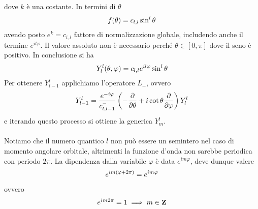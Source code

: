 \documentclass{article}
\begin{document}
dove $k$ è una costante. In termini di $\theta$
\begin{gather}
    f(\theta) = c_{l, l}\sin^l\theta \notag
\end{gather}
avendo posto $e^{k} = c_{l, l}$ fattore di normalizzazione globale, includendo anche il termine $e^{il\varphi}$. Il valore assoluto non è necessario perché $\theta \in [0, \pi]$ dove il seno è positivo. In conclusione si ha
\begin{gather}
    Y^l_l(\theta, \varphi) = c_{l, l}e^{il\varphi}\sin^l\theta \notag
\end{gather}
Per ottenere $Y^l_{l - 1}$ applichiamo l'operatore $L_-$, ovvero
\begin{gather}
    Y^l_{l - 1} = \frac{e^{-i\varphi}}{c^-_{l, {l-1}}}\left( -\frac{\partial}{\partial \theta} + i\cot \theta \frac{\partial}{\partial \varphi} \right)Y^l_l \notag 
\end{gather}
e iterando questo processo si ottiene la generica $Y^l_m$. \\ \\
Notiamo che il numero quantico $l$ non può essere un semintero nel caso di momento angolare orbitale, altrimenti la funzione d'onda non sarebbe periodica con periodo $2\pi$. La dipendenza dalla variabile $\varphi$ è data $e^{im\varphi}$, deve dunque valere
\begin{gather}
    e^{im(\varphi + 2\pi)} = e^{im\varphi} \notag
\end{gather}
ovvero
\begin{gather}
    e^{im2\pi} = 1 \implies m \in \mathbf{Z} \notag
\end{gather}
\end{document}
